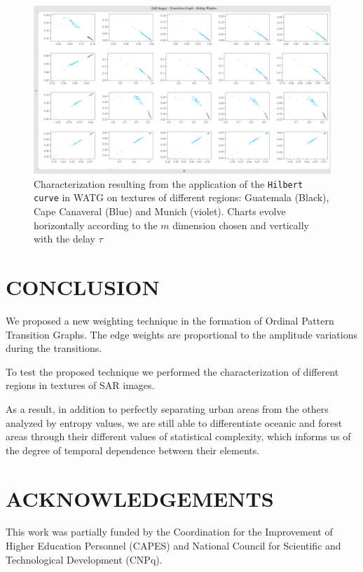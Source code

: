\documentclass{isprs}
\begin{document}
	
	\begin{figure}
		\centering
		\includegraphics[width=1.05\textwidth]{Figures/transitionGraphHilbert.pdf}
		\caption{Characterization resulting from the application of the \texttt{Hilbert curve} in WATG on textures of different regions: Guatemala (Black), Cape Canaveral (Blue) and Munich (violet). Charts evolve horizontally according to the $m$ dimension chosen and vertically with the delay $\tau$}
		\label{fig:Regions}
	\end{figure}
	
	
	\section{CONCLUSION}\label{Conclusion}
	
	We proposed a new weighting technique in the formation of Ordinal Pattern Transition Graphs.
	The edge weights are proportional to the amplitude variations during the transitions.
	
	To test the proposed technique we performed the characterization of different regions in textures of SAR images.
	
	As a result, in addition to perfectly separating urban areas from the others analyzed by entropy values, we are still able to differentiate oceanic and forest areas through their different values of statistical complexity, which informs us of the degree of temporal dependence between their elements.
	
	
	
	
	\section*{ACKNOWLEDGEMENTS}\label{ACKNOWLEDGEMENTS}
	
	This work was partially funded by the Coordination for the Improvement of Higher Education Personnel (CAPES) and National Council for Scientific and Technological Development (CNPq).
	
	
\end{document}
